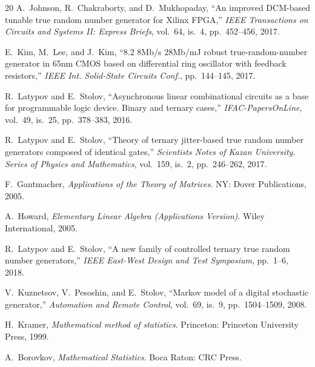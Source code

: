 \documentclass[a4paper,12pt]{article}
\begin{document}
\begin{thebibliography}{20}
 A.~Johnson, R.~Chakraborty, and D.~Mukhopaday, ``An improved DCM-based tunable true random number generator for Xilinx FPGA,'' \textit{IEEE Transactions on Circuits and Systems II: Express Briefs}, vol.~64, is.~4, pp.~452--456, 2017.

 E.~Kim, M.~Lee, and J.~Kim, ``8.2 8Mb/s 28Mb/mJ robust true-random-number generator in 65nm CMOS based on differential ring oscillator with feedback resistors,'' \textit{IEEE Int. Solid-State Circuits Conf.}, pp.~144--145, 2017.

 R.~Latypov and E.~Stolov, ``Asynchronous linear combinational circuits as a base for programmable logic device. Binary and ternary cases,'' \textit{IFAC-PapersOnLine}, vol.~49, is.~25, pp.~378--383, 2016.

 R.~Latypov and E.~Stolov, ``Theory of ternary jitter-based true random number generators composed of identical gates,'' \textit{Scientists Notes of Kazan University. Series of Physics and Mathematics}, vol.~159, is.~2, pp.~246--262, 2017.

 F.~Gantmacher, \textit{Applications of the Theory of Matrices}. NY: Dover Publications, 2005.

 A.~Howard, \textit{Elementary Linear Algebra (Applications Version)}. Wiley International, 2005.

 R.~Latypov and E.~Stolov, ``A new family of controlled ternary true random number generators,'' \textit{IEEE East-West Design and Test Symposium}, pp.~1--6, 2018.

 V.~Kuznetsov, V.~Pesoshin, and E.~Stolov, ``Markov model of a digital stochastic generator,'' \textit{Automation and Remote Control}, vol.~69, is.~9, pp.~1504--1509, 2008.

 H.~Kramer, \textit{Mathematical method of statistics}. Princeton: Princeton University Press, 1999.

 A.~Borovkov, \textit{Mathematical Statistics}. Boca Raton: CRC Press.

\end{thebibliography}
\end{document}
